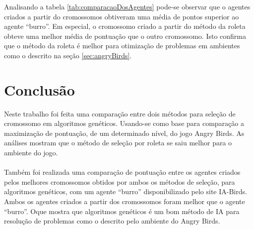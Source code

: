 \documentclass[10pt,a4paper]{article}
\begin{document}
  Analisando a tabela \ref{tab:comparacaoDosAgentes} pode-se observar que o agentes criados a partir do cromossomos obtiveram uma média de pontos superior ao agente ``burro''. Em especial, o cromossomo criado a partir do método da roleta obteve uma melhor média de pontuação que o outro cromossomo. Isto confirma que o método da roleta é melhor para otimização de problemas em ambientes como o descrito na seção \ref{sec:angryBirds}.

\section{Conclusão}
Neste trabalho foi feita uma comparação entre dois métodos para seleção de cromossomo em algoritmos genéticos. Usando-se como base para comparação a maximização de pontuação, de um determinado nível, do jogo Angry Birds.  As análises mostram que o método de seleção por roleta se saiu melhor para o ambiente do jogo. \\ \\
Também foi realizada uma comparação de pontuação entre os agentes criados pelos melhores cromossomos obtidos por ambos os métodos de seleção, para algoritmos genéticos, com um agente ``burro'' disponibilizado pelo site IA-Birds. Ambos os agentes criados a partir dos cromossomos foram melhor que o agente ``burro''. Oque mostra que algoritmos genéticos é um bom método de IA para resolução de problemas como o descrito pelo ambiente do Angry Birds.


\end{document}
